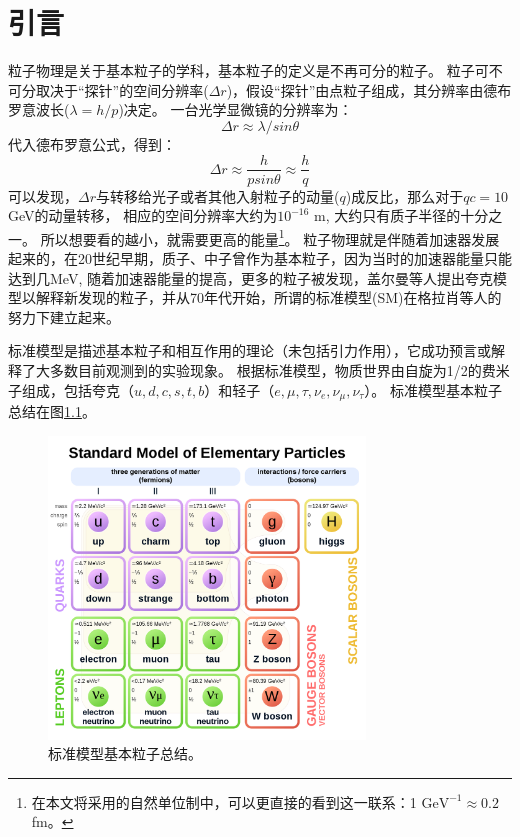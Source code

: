 \chapter{引言}\label{chap:introduction}
粒子物理是关于基本粒子的学科，基本粒子的定义是不再可分的粒子。
粒子可不可分取决于“探针”的空间分辨率($\Delta r$)，假设“探针”由点粒子组成，其分辨率由德布罗意波长($\lambda=h/p$)决定。
一台光学显微镜的分辨率为：
\begin{equation}
 \Delta r\approx \lambda/sin\theta
\end{equation}
代入德布罗意公式，得到：
\begin{equation}
 \Delta r\approx \frac{h}{psin\theta}\approx \frac{h}{q}
\end{equation}
可以发现，$\Delta r$与转移给光子或者其他入射粒子的动量($q$)成反比，那么对于$qc=10$ GeV的动量转移，
相应的空间分辨率大约为$10^{-16}$ m, 大约只有质子半径的十分之一。
所以想要看的越小，就需要更高的能量\footnote{在本文将采用的自然单位制中，可以更直接的看到这一联系：1 $\text{GeV}^{-1}\approx 0.2$ fm。}。
粒子物理就是伴随着加速器发展起来的，在20世纪早期，质子、中子曾作为基本粒子，因为当时的加速器能量只能达到几MeV,
随着加速器能量的提高，更多的粒子被发现，盖尔曼等人提出夸克模型以解释新发现的粒子\cite{GELLMANN1964214,Zweig:352337,Zweig:570209}，并从70年代开始，所谓的标准模型(SM)在格拉肖等人的努力下建立起来\cite{GLASHOW1961579,PhysRevLett.19.1264,PhysRev.136.B763,PhysRevLett.30.1343,THOOFT1972189}。

标准模型是描述基本粒子和相互作用的理论（未包括引力作用），它成功预言或解释了大多数目前观测到的实验现象。
根据标准模型，物质世界由自旋为1/2的费米子组成，包括夸克（$u, d, c, s, t, b$）和轻子（$e, \mu, \tau, \nu_e, \nu_{\mu}, \nu_{\tau}$）。
标准模型基本粒子总结在图\ref{fig:SM_particles}。
\begin{figure}
 \centering
 \includegraphics[width=0.75\textwidth]{fig/SM_particles.png}
 \caption{标准模型基本粒子总结。}
 \label{fig:SM_particles}
\end{figure}

